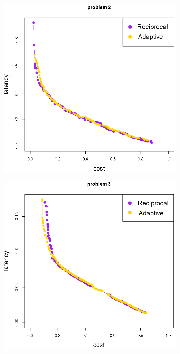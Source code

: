 \begin{figure}[h!]
   \centering
   \begin{subfigure}{0.49\textwidth}
       \includegraphics[width=\textwidth]{pics/transfer_problem2.png}
	   \caption{}
   \end{subfigure}
   \begin{subfigure}{0.49\textwidth}
       \includegraphics[width=\textwidth]{pics/transfer_problem3.png}

\end{subfigure}
\end{figure}
